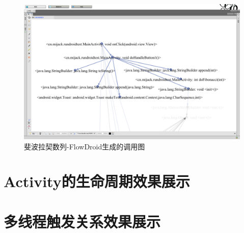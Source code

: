 \begin{figure}[ht]
\centering
\includegraphics[width=\textwidth]{./Figures/FlowDroid-Fibonacci.png}
\caption{斐波拉契数列-FlowDroid生成的调用图}
\label{fig:flowdroid-result-Fibonacci}
\end{figure}

\section{Activity的生命周期效果展示}


\section{多线程触发关系效果展示}

